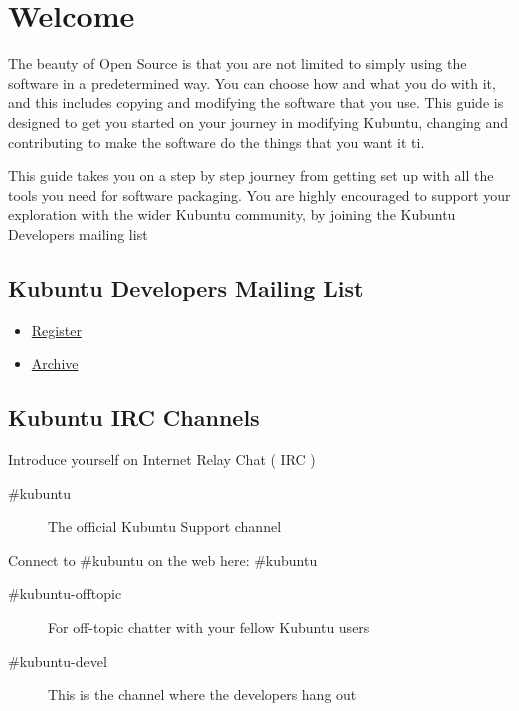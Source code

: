 \documentclass[letterpaper,10pt,english]{sphinxmanual}
\begin{document}
\section{Welcome}
\label{docs/packaging_guide/welcome:welcome}\label{docs/packaging_guide/welcome::doc}
The beauty of Open Source is that you are not limited to simply using the software in a predetermined way. You can choose how and what you do with it, and this includes copying and modifying the software that you use.
This guide is designed to get you started on your journey in modifying Kubuntu, changing and contributing to make the software do the things that you want it ti.

This guide takes you on a step by step journey from getting set up with all the tools you need for software packaging. You are highly encouraged to support your exploration with the wider Kubuntu community, by joining the Kubuntu Developers mailing list


\subsection{Kubuntu Developers Mailing List}
\label{docs/packaging_guide/welcome:kubuntu-developers-mailing-list}\begin{itemize}
\item {} 
\href{https://lists.ubuntu.com/mailman/listinfo/kubuntu-devel}{Register}

\item {} 
\href{https://lists.ubuntu.com/archives/kubuntu-devel}{Archive}

\end{itemize}


\subsection{Kubuntu IRC Channels}
\label{docs/packaging_guide/welcome:kubuntu-irc-channels}
Introduce yourself on Internet Relay Chat ( IRC )
\begin{description}
\item[{\#kubuntu}] \leavevmode
The official Kubuntu Support channel

\end{description}

Connect to \#kubuntu on the web here: \#kubuntu
\begin{description}
\item[{\#kubuntu-offtopic}] \leavevmode
For off-topic chatter with your fellow Kubuntu users

\item[{\#kubuntu-devel}] \leavevmode
This is the channel where the developers hang out

\end{description}
\end{document}
